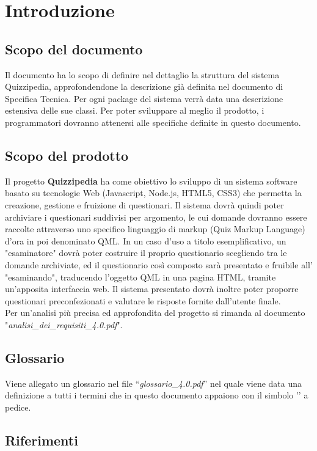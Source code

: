 \documentclass[a4paper,11pt]{article}
\begin{document}
	\newpage
	\section{Introduzione}
	\subsection{Scopo del documento}
	Il documento ha lo scopo di definire nel dettaglio la struttura del sistema Quizzipedia, approfondendone la descrizione già definita nel documento di Specifica Tecnica. Per ogni package del sistema verrà data una descrizione estensiva delle sue classi. Per poter sviluppare al meglio il prodotto, i programmatori dovranno attenersi alle specifiche definite in questo documento.
	
	\subsection{Scopo del prodotto}
	Il progetto \textbf{Quizzipedia} ha come obiettivo lo sviluppo di un sistema software basato su tecnologie Web (Javascript\addglos, Node.js\addglos, HTML5\addglos, CSS3\addglos) che permetta la creazione, gestione e fruizione di questionari. Il sistema dovrà quindi poter archiviare i questionari suddivisi per argomento, le cui domande dovranno essere raccolte attraverso uno specifico linguaggio di markup (Quiz Markup Language) d'ora in poi denominato QML\addglos. In un caso d'uso a titolo esemplificativo, un "esaminatore" dovrà poter costruire il proprio questionario scegliendo tra le domande archiviate, ed il questionario così composto sarà presentato e fruibile all' "esaminando", traducendo l'oggetto QML in una pagina HTML\addglos, tramite un'apposita interfaccia web. Il sistema presentato dovrà inoltre poter proporre questionari preconfezionati e valutare le risposte fornite dall'utente finale.
	\\
	Per un'analisi più precisa ed approfondita del progetto si rimanda al documento\\ "\textit{analisi\_dei\_requisiti\_4.0.pdf}".
	\subsection{Glossario}
	Viene allegato un glossario nel file ``\textit{glossario\_4.0.pdf}'' nel quale viene data una definizione a tutti i termini che in questo documento appaiono con il simbolo '\addglos' a pedice.
	\subsection{Riferimenti}
\end{document}
